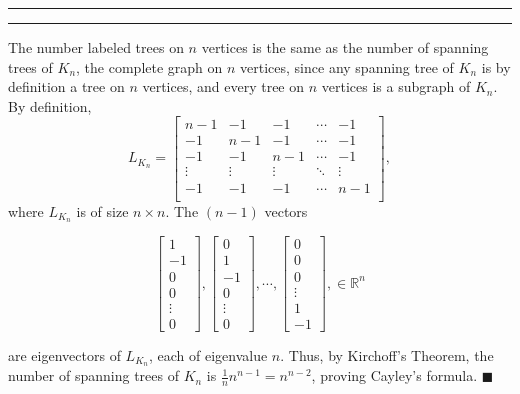 \documentclass[11pt]{article}
\newcounter{questionCounter}
\newcounter{partCounter}[questionCounter]
\newenvironment{question}[2][\arabic{questionCounter}]{%
    \setcounter{partCounter}{0}%
    \vspace{.25in} \hrule \vspace{0.5em}%
        \noindent{\bf #2}%
    \vspace{0.8em} \hrule \vspace{.10in}%
    \addtocounter{questionCounter}{1}%
}{}
\begin{document}
\begin{question}{Problem 5}
The number labeled trees on $n$ vertices is the same as the number of spanning
trees of $K_n$, the complete graph on $n$ vertices, since any spanning tree of
$K_n$ is by definition a tree on $n$ vertices, and every tree on $n$ vertices
is a subgraph of $K_n$. By definition,
\[L_{K_n} =
\left[\begin{array}{ccccc}
 n - 1  &   -1   &   -1   & \cdots &   -1   \\
   -1   & n - 1  &   -1   & \cdots &   -1   \\
   -1   &   -1   & n - 1  & \cdots &   -1   \\
 \vdots & \vdots & \vdots & \ddots & \vdots \\
   -1   &   -1   &   -1   & \cdots & n - 1  \\
\end{array}\right],\]
where $L_{K_n}$ is of size $n \times n$. The $(n - 1)$ vectors

\[
\left[\begin{array}{c}
  1     \\
  -1    \\
  0     \\
  0     \\
 \vdots \\
  0
\end{array}\right],
\left[\begin{array}{c}
  0     \\
  1     \\
  -1    \\
  0     \\
 \vdots \\
  0
\end{array}\right], \cdots,
\left[\begin{array}{c}
  0     \\
  0     \\
  0     \\
 \vdots \\
  1     \\
  -1
\end{array}\right], \in \mathbb{R}^n\]

are eigenvectors of $L_{K_n}$, each of eigenvalue $n$. Thus, by Kirchoff's
Theorem, the number of spanning trees of $K_n$ is
$\frac{1}{n}n^{n - 1} = n^{n - 2}$, proving Cayley's formula.
\qquad $\blacksquare$
\end{question}
\end{document}
